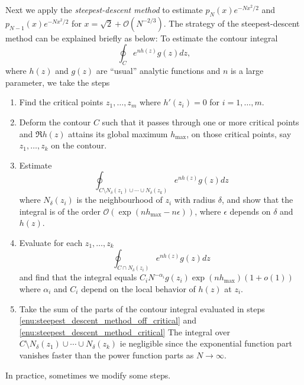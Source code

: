\documentclass[11pt, a4paper]{article}
\numberwithin{equation}{section}
\newcommand{\bigO}{\mathcal{O}}
\theoremstyle{definition}
\theoremstyle{remark}
\begin{document}
Next we apply the \emph{steepest-descent method} to estimate $p_N(x) e^{-Nx^2/2}$ and $p_{N - 1}(x) e^{-Nx^2/2}$ for $x = \sqrt{2} + \bigO(N^{-2/3})$. The strategy of the steepest-descent method can be explained briefly as below: To estimate the contour integral
\begin{equation}
  \oint_C e^{nh(z)} g(z) dz,
\end{equation}
where $h(z)$ and $g(z)$ are ``usual'' analytic functions and $n$ is a large parameter, we take the steps
\begin{enumerate}
\item
  Find the critical points $z_1, \dotsc, z_m$ where $h'(z_i) = 0$ for $i = 1, \dotsc, m$.
\item \label{enu:steepest_descent_method_contour}
  Deform the contour $C$ such that it passes through one or more critical points and $\Re h(z)$ attains its global maximum $h_{\max}$, on those critical points, say $z_1, \dotsc, z_k$ on the contour.
\item \label{enu:steepest_descent_method_off_critical}
  Estimate
  \begin{equation}
    \oint_{C \setminus N_{\delta}(z_1) \cup \dotsb \cup N_{\delta}(z_k)} e^{nh(z)} g(z) dz
  \end{equation}
  where $N_{\delta}(z_i)$ is the neighbourhood of $z_i$ with radius $\delta$, and show that the integral is of the order $\bigO(\exp(n h_{\max} - n\epsilon))$, where $\epsilon$ depends on $\delta$ and $h(z)$.
\item \label{enu:steepest_descent_method_critical}
  Evaluate for each $z_1, \dotsc, z_k$
  \begin{equation}
    \oint_{C \cap N_{\delta}(z_i)} e^{nh(z)} g(z) dz
  \end{equation}
  and find that the integral equals $C_i N^{-\alpha_i} g(z_i) \exp(n h_{\max}) (1 + o(1))$ where $\alpha_i$ and $C_i$ depend on the local behavior of $h(z)$ at $z_i$.
\item
  Take the sum of the parts of the contour integral evaluated in steps \ref{enu:steepest_descent_method_off_critical} and \ref{enu:steepest_descent_method_critical} The integral over $C \setminus N_{\delta}(z_1) \cup \dotsb \cup N_{\delta}(z_k)$ ie negligible since the exponential function part vanishes faster than the power function parts as $N \to \infty$.
\end{enumerate}
In practice, sometimes we modify some steps.
\end{document}
